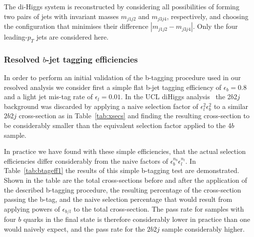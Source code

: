 \documentclass[12pt]{article}
\begin{document}
The di-Higgs system is reconstructed by considering all possibilities of forming two pairs of jets with invariant masses $m_{j1j2}$ and 
$m_{j3j4}$, respectively, and choosing the configuration that minimises their difference $|m_{j1j2} - m_{j3j4}|$. Only the four leading-$p_T$ jets
are considered here.

\subsubsection{Resolved $b$-jet tagging efficiencies}
In order to perform an initial validation of the b-tagging procedure used in our resolved analysis we consider first a simple flat b-jet tagging efficiency of $\epsilon_b=0.8$ and a light jet mis-tag rate of $\epsilon_l=0.01$. In the UCL diHiggs analysis~\cite{Wardrope:2014kya} the 2$b$2$j$ background was discarded by applying a naive selection factor of $\epsilon^2_l\epsilon^2_b$ to a similar $2b2j$ cross-section as in Table~\ref{tab:xsecs} and finding the resulting cross-section to be considerably smaller than the equivalent selection factor applied to the 4$b$ sample.

In practice we have found with these simple efficiencies, that the actual selection efficiencies differ considerably from the naive factors of $\epsilon_b^{n_b}\epsilon_l^{n_l}$.
In Table~\ref{tab:btageff1} the results of this simple b-tagging test are demonstrated. Shown in the table are the total cross-sections before and after the application of the described b-tagging procedure, the resulting percentage of the cross-section passing the b-tag, and the naive selection percentage that would result from applying powers of $\epsilon_{b/l}$ to the total cross-section. The pass rate for samples with four $b$ quarks in the final state is therefore considerably lower in practice than one would naively expect, and the pass rate for the $2b2j$ sample considerably higher.
\end{document}
